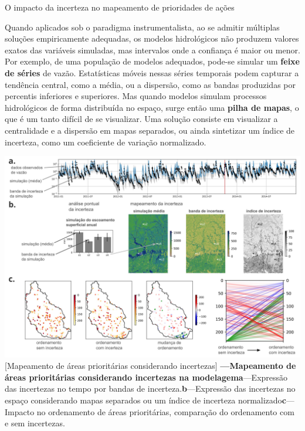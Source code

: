 \documentclass[./main.tex]{subfiles}
\begin{document}
\begin{simplebox}[
    float=ht!,
    label={destaque_mapas_incerteza},
    nameref={Mapas de incerteza}
    ]{O impacto da incerteza no mapeamento de prioridades de ações}
    \footnotesize
    \begin{minipage}[t]{\linewidth}  
    \par Quando aplicados sob o paradigma instrumentalista, ao se admitir múltiplas soluções empiricamente adequadas, os modelos hidrológicos não produzem valores exatos das variáveis simuladas, mas intervalos onde a confiança é maior ou menor. Por exemplo, de uma população de modelos adequados, pode-se simular um \textbf{feixe de séries} de vazão. Estatísticas móveis nessas séries temporais podem capturar a tendência central, como a média, ou a dispersão, como as bandas produzidas por percentis inferiores e superiores. Mas quando modelos simulam processos hidrológicos de forma distribuída no espaço, surge então uma \textbf{pilha de mapas}, o que é um tanto difícil de se visualizar. Uma solução consiste em visualizar a centralidade e a dispersão em mapas separados, ou ainda sintetizar um índice de incerteza, como um coeficiente de variação normalizado.
    \end{minipage}
    
    \begin{minipage}[t]{\linewidth}
        \begin{minipage}[t]{\linewidth}
        \vspace*{5pt}
        	\includegraphics[width=\linewidth]{figs/fig_uncert.jpg}	
        	[Mapeamento de áreas prioritárias considerando incertezas]{
                \textbf{---\;Mapeamento de áreas prioritárias considerando incertezas na modelagem}\;\textbf{a}\;---\;Expressão das incertezas no tempo por bandas de incerteza.\;\textbf{b}\;---\;Expressão das incertezas no espaço considerando mapas separados ou um índice de incerteza normalizado\;\textbf{c}\;---\;Impacto no ordenamento de áreas prioritárias, comparação do ordenamento com e sem incertezas. 
        	}
            \label{fig:mapsuncer}  %
        \vspace*{5pt}
        \end{minipage}
    \end{minipage}
    

\end{simplebox}
\end{document}
